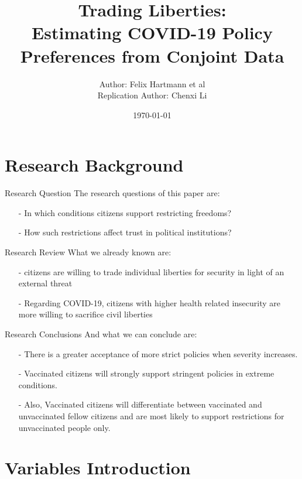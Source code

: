 \documentclass{beamer}
\title{Trading Liberties: \\
Estimating COVID-19 Policy Preferences from Conjoint Data}
\date{\today}
\author{Author: Felix Hartmann et al \\
Replication Author: Chenxi Li}
\institute{Trinity College Dublin\\College Green, Dublin 2}
\begin{document}
\maketitle

\section{Research Background}

\begin{frame}{Research Question}
	\noindent The research questions of this paper are:
	\begin{itemize}
		\item[-] In which conditions citizens support restricting freedoms?
		\item[-] How such restrictions affect trust in political institutions?
	\end{itemize}
\end{frame}

\begin{frame}{Research Review}
\noindent What we already known are:
\begin{itemize}
	\item[-] citizens are willing to trade individual liberties for security in light of an external threat \citep{davis2004civil}
	\item[-] Regarding COVID-19, citizens with higher health related insecurity are more willing to sacrifice civil liberties \citep{stantcheva2020civil}
\end{itemize}
\end{frame}

\begin{frame}{Research Conclusions}
\noindent And what we can conclude are:
\begin{itemize}
	\item[-] There is a greater acceptance of more strict policies when severity increases.
	\item[-] Vaccinated citizens will strongly support stringent policies in extreme conditions.
	\item[-] Also, Vaccinated citizens will differentiate between vaccinated and unvaccinated fellow citizens and are most likely to support restrictions for unvaccinated people only.  
\end{itemize}
\end{frame}

\section{Variables Introduction}
\end{document}
